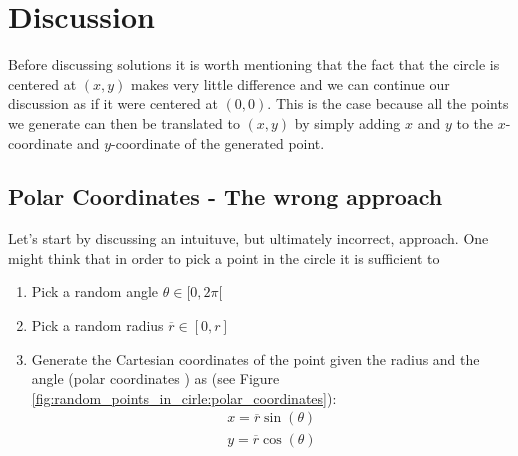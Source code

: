 \section{Discussion}
\label{random_points_in_circle:sec:discussion}
Before discussing solutions it is worth mentioning that the fact that the circle is centered at $(x,y)$ makes very little difference and we can continue our discussion as if it were centered at $(0,0)$. This is the case because all the points we generate can then be translated to $(x,y)$ by simply adding $x$ and $y$ to the $x$-coordinate and $y$-coordinate of the generated point.

\subsection{Polar Coordinates - The wrong approach}
\label{random_points_in_circle:sec:buggy}
Let's start by discussing an intuituve, but ultimately incorrect, approach. One might think that in order to pick a point in the circle it is sufficient to 
\begin{enumerate}
	\item Pick a random angle $\theta \in [0, 2\pi[ $
	\item Pick a random radius $\overline{r} \in [0,r]$
	\item Generate the Cartesian coordinates of the point given the radius and the angle (polar coordinates \cite{cit:wiki:polarcoordinates}) as (see Figure \ref{fig:random_points_in_cirle:polar_coordinates}):
	\begin{gather*}
		 x=\overline{r}\sin(\theta) \\
		 y=\overline{r}\cos(\theta) 
	\end{gather*}
\end{enumerate}

